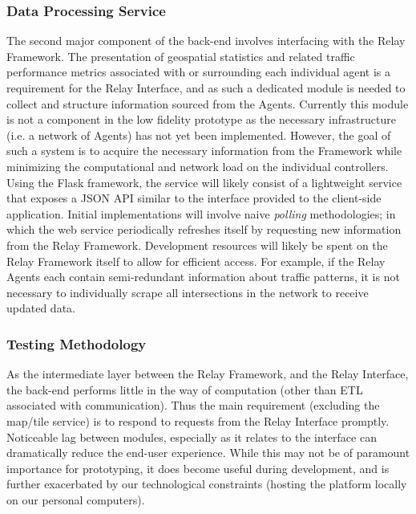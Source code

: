 \documentclass{article}
\begin{document}
\subsubsection{Data Processing Service}

The second major component of the back-end involves interfacing with the Relay Framework.
The presentation of geospatial statistics and related traffic performance metrics associated with or surrounding each individual agent is a requirement for the Relay Interface, and as such a dedicated module is needed to collect and structure information sourced from the Agents.
Currently this module is not a component in the low fidelity prototype as the necessary infrastructure (i.e. a network of Agents) has not yet been implemented.
However, the goal of such a system is to acquire the necessary information from the Framework while minimizing the computational and network load on the individual controllers.
Using the Flask framework, the service will likely consist of a lightweight service that exposes a JSON API similar to the interface provided to the client-side application.
Initial implementations will involve naive \emph{polling} methodologies; in which the web service periodically refreshes itself by requesting new information from the Relay Framework.
Development resources will likely be spent on the Relay Framework itself to allow for efficient access.
For example, if the Relay Agents each contain semi-redundant information about traffic patterns, it is not necessary to individually scrape all intersections in the network to receive updated data.\\

\subsubsection{Testing Methodology}

As the intermediate layer between the Relay Framework, and the Relay Interface, the back-end performs little in the way of computation (other than ETL associated with communication).
Thus the main requirement (excluding the map/tile service) is to respond to requests from the Relay Interface promptly.
Noticeable lag between modules, especially as it relates to the interface can dramatically reduce the end-user experience.
While this may not be of paramount importance for prototyping, it does become useful during development, and is further exacerbated by our technological constraints (hosting the platform locally on our personal computers).\\
\end{document}
